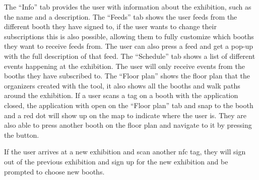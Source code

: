 The ``Info'' tab provides the user with information about the exhibition, such as the name and a description. The ``Feeds'' tab shows the user feeds from the different booth they have signed to, if the user wants to change their subscriptions this is also possible, allowing them to fully customize which booths they want to receive feeds from. The user can also press a feed and get a pop-up with the full description of that feed. The ``Schedule'' tab shows a list of different events happening at the exhibition. The user will only receive events from the booths they have subscribed to. The ``Floor plan'' shows the floor plan that the organizers created with the tool, it also shows all the booths and walk paths around the exhibition. If a user scans a tag on a booth with the application closed, the application with open on the ``Floor plan'' tab and snap to the booth and a red dot will show up on the map to indicate where the user is. They are also able to press another booth on the floor plan and navigate to it by pressing the button. 

If the user arrives at a new exhibition and scan another \ac{nfc} tag, they will sign out of the previous exhibition and sign up for the new exhibition and be prompted to choose new booths. 